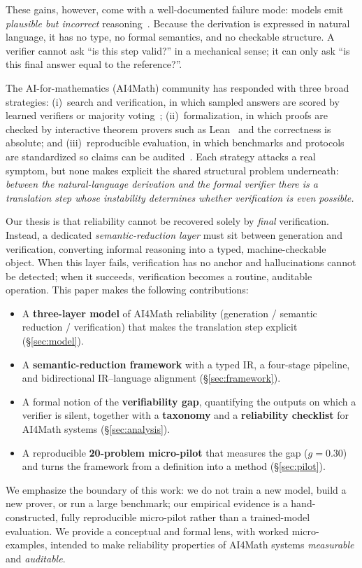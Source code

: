 \documentclass[11pt]{article}
\theoremstyle{definition}
\theoremstyle{plain}
\theoremstyle{remark}
\begin{document}
These gains, however, come with a well-documented failure mode: models emit
\emph{plausible but incorrect} reasoning~\cite{bubeck2023,frieder2023,collins2024}. Because
the derivation is expressed in natural language, it has no type, no formal semantics, and no
checkable structure. A verifier cannot ask ``is this step valid?'' in a mechanical sense; it
can only ask ``is this final answer equal to the reference?''.

The AI-for-mathematics (AI4Math) community has responded with three broad strategies:
(i)~search and verification, in which sampled answers are scored by learned verifiers or
majority voting~\cite{cobbe2021,wang2023selfconsistency,lightman2024};
(ii)~formalization, in which proofs are checked by interactive theorem provers such as
Lean~\cite{demoura2015,demoura2021} and the correctness is absolute; and
(iii)~reproducible evaluation, in which benchmarks and protocols are standardized so claims can
be audited~\cite{hendrycks2021,zheng2022}. Each strategy attacks a real symptom, but none
makes explicit the shared structural problem underneath: \emph{between the natural-language
derivation and the formal verifier there is a translation step whose instability determines
whether verification is even possible.}

Our thesis is that reliability cannot be recovered solely by \emph{final} verification.
Instead, a dedicated \emph{semantic-reduction layer} must sit between generation and
verification, converting informal reasoning into a typed, machine-checkable object. When this
layer fails, verification has no anchor and hallucinations cannot be detected; when it
succeeds, verification becomes a routine, auditable operation. This paper makes the following
contributions:
\begin{itemize}[leftmargin=1.5em]
  \item A \textbf{three-layer model} of AI4Math reliability (generation / semantic reduction /
        verification) that makes the translation step explicit (\S\ref{sec:model}).
  \item A \textbf{semantic-reduction framework} with a typed IR, a four-stage pipeline, and
        bidirectional IR--language alignment (\S\ref{sec:framework}).
  \item A formal notion of the \textbf{verifiability gap}, quantifying the outputs on which a
        verifier is silent, together with a \textbf{taxonomy} and a \textbf{reliability
        checklist} for AI4Math systems (\S\ref{sec:analysis}).
  \item A reproducible \textbf{20-problem micro-pilot} that measures the gap
        ($g = 0.30$) and turns the framework from a definition into a method
        (\S\ref{sec:pilot}).
\end{itemize}
We emphasize the boundary of this work: we do not train a new model, build a new prover, or
run a large benchmark; our empirical evidence is a hand-constructed, fully reproducible
micro-pilot rather than a trained-model evaluation. We provide a conceptual and formal lens,
with worked micro-examples,
intended to make reliability properties of AI4Math systems \emph{measurable} and
\emph{auditable}.
\end{document}
